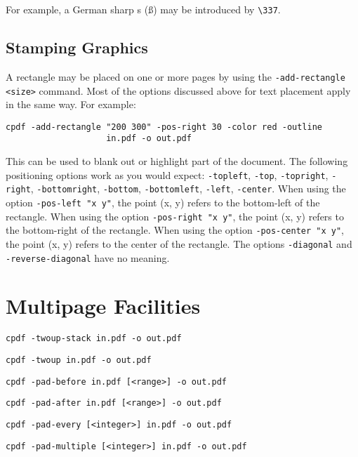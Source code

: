 \documentclass{book}
\begin{document}
For example, a German sharp s (\ss) may be introduced by \verb!\337!. 

\section{Stamping Graphics}

A rectangle may be placed on one or more pages by using the \texttt{-add-rectangle <size>} command. Most of the options discussed above for text placement apply in the same way. For example:

\begin{framed}
  \small\begin{verbatim}cpdf -add-rectangle "200 300" -pos-right 30 -color red -outline
                    in.pdf -o out.pdf\end{verbatim}
\end{framed}

This can be used to blank out or highlight part of the document. The following positioning options work as you would expect: \texttt{-topleft}, \texttt{-top}, \texttt{-topright}, \texttt{-right}, \texttt{-bottomright}, \texttt{-bottom}, \texttt{-bottomleft}, \texttt{-left}, \texttt{-center}. When using the option \texttt{-pos-left "x y"}, the point (x, y) refers to the bottom-left of the rectangle. When using the option \texttt{-pos-right "x y"}, the point (x, y) refers to the bottom-right of the rectangle. When using the option \texttt{-pos-center "x y"}, the point (x, y) refers to the center of the rectangle. The options \texttt{-diagonal} and \texttt{-reverse-diagonal} have no meaning.\pagestyle{empty}\thispagestyle{fancy}


\chapter{Multipage Facilities}\pagestyle{fancy}
  \begin{framed}
    \small\noindent\verb!cpdf -twoup-stack in.pdf -o out.pdf! 

    \vspace{1.5mm}
    \small\noindent\verb!cpdf -twoup in.pdf -o out.pdf! 

    \vspace{1.5mm}
    \small\noindent\verb!cpdf -pad-before in.pdf [<range>] -o out.pdf!

    \vspace{1.5mm}
    \small\noindent\verb!cpdf -pad-after in.pdf [<range>] -o out.pdf!

    \vspace{1.5mm}
    \small\noindent\verb!cpdf -pad-every [<integer>] in.pdf -o out.pdf!

    \vspace{1.5mm}
    \small\noindent\verb!cpdf -pad-multiple [<integer>] in.pdf -o out.pdf!
  \end{framed}
\end{document}
